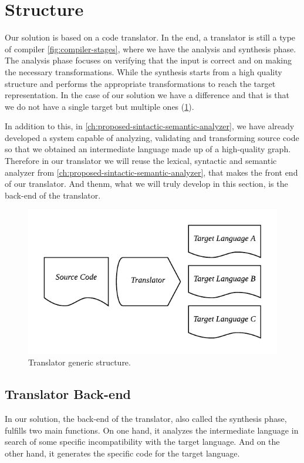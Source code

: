 \section{Structure}
Our solution is based on a code translator. In the end, a translator is still a type of compiler \cref{fig:compiler-stages},
where we have the analysis and synthesis phase. The analysis phase focuses on verifying that the input is correct and on
making the necessary transformations. While the synthesis starts from a high quality structure and performs the
appropriate transformations to reach the target representation. In the case of our solution we have a difference
and that is that we do not have a single target but multiple ones (\cref{fig:translator}).

In addition to this, in \cref{ch:proposed-sintactic-semantic-analyzer}, we have already developed a system capable of analyzing,
validating and transforming source code so that we obtained an intermediate language made up of a
high-quality graph. Therefore in our translator we will reuse the lexical, syntactic and semantic
analyzer from \cref{ch:proposed-sintactic-semantic-analyzer}, that makes the front end of our translator.
And thenm, what we will truly develop in this section, is the back-end of the translator.

\begin{figure}
    \includegraphics{images/translator.pdf}
    \centering
	\caption[Translator generic structure]{Translator generic structure.}
    \label{fig:translator}
\end{figure}

\subsection{Translator Back-end}
In our solution, the back-end of the translator, also called the synthesis phase,
fulfills two main functions. On one hand, it analyzes the intermediate language
in search of some specific incompatibility with the target language. And on the
other hand, it generates the specific code for the target language.

